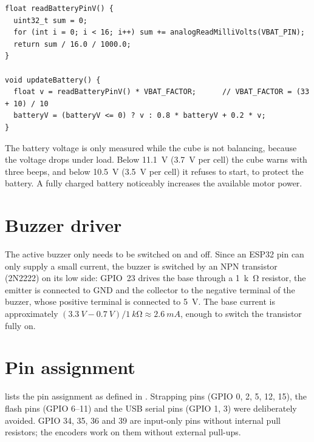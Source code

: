 \begin{lstlisting}[caption={Battery measurement in \cmd{hardware.ino}: 16 samples are averaged and
  converted to the battery voltage.}, label={lst:battery}]
float readBatteryPinV() {
  uint32_t sum = 0;
  for (int i = 0; i < 16; i++) sum += analogReadMilliVolts(VBAT_PIN);
  return sum / 16.0 / 1000.0;
}

void updateBattery() {
  float v = readBatteryPinV() * VBAT_FACTOR;      // VBAT_FACTOR = (33 + 10) / 10
  batteryV = (batteryV <= 0) ? v : 0.8 * batteryV + 0.2 * v;
}
\end{lstlisting}

The battery voltage is only measured while the cube is not balancing, because the voltage drops
under load. Below \SI{11.1}{V} (\SI{3.7}{V} per cell) the cube warns with three beeps, and below
\SI{10.5}{V} (\SI{3.5}{V} per cell) it refuses to start, to protect the battery. A fully charged
battery noticeably increases the available motor power.

\section{Buzzer driver}

The active buzzer only needs to be switched on and off. Since an ESP32 pin can only supply a
small current, the buzzer is switched by an NPN transistor (2N2222) on its low side: GPIO~23 drives
the base through a \SI{1}{k\ohm} resistor, the emitter is connected to GND and the collector to
the negative terminal of the buzzer, whose positive terminal is connected to \SI{5}{V}. The base
current is approximately $(\SI{3.3}{V} - \SI{0.7}{V}) / \SI{1}{k\ohm} \approx \SI{2.6}{mA}$,
enough to switch the transistor fully on.

\section{Pin assignment}

 lists the pin assignment as defined in . Strapping pins
(GPIO 0, 2, 5, 12, 15), the flash pins (GPIO 6--11) and the USB serial pins (GPIO 1, 3) were
deliberately avoided. GPIO 34, 35, 36 and 39 are input-only pins without internal pull
resistors; the encoders work on them without external pull-ups.

